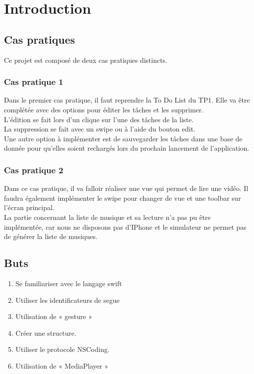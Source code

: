 \newpage 
\section{Introduction}
\subsection{Cas pratiques}
Ce projet est composé de deux cas pratiques distincts.
\subsubsection{Cas pratique 1}
Dans le premier cas pratique, il faut reprendre la To Do List du TP1. Elle va être complétée avec des options pour éditer les tâches et les supprimer.\\
L'édition se fait lors d'un clique sur l'une des tâches de la liste.\\
La suppression se fait avec un swipe ou à l'aide du bouton edit.\\
Une autre option à implémenter est de sauvegarder les tâches dans une base de donnée pour qu'elles soient rechargés lors du prochain lancement de l'application.

\subsubsection{Cas pratique 2}
Dans ce cas pratique, il va falloir réaliser une vue qui permet de lire une vidéo. Il faudra également implémenter le swipe pour changer de vue et une toolbar sur l'écran principal.\\ La partie concernant la liste de musique et sa lecture n'a pas pu être implémentée, car nous ne disposons pas d'IPhone et le simulateur ne permet pas de générer la liste de musiques.

\subsection{Buts}
\begin{enumerate}
	\item Se familiariser avec le langage swift
	\item Utiliser les identificateurs de segue
	\item Utilisation de « gesture »
	\item Créer une structure.
	\item Utiliser le protocole NSCoding.
	\item Utilisation de « MediaPlayer »
\end{enumerate}
